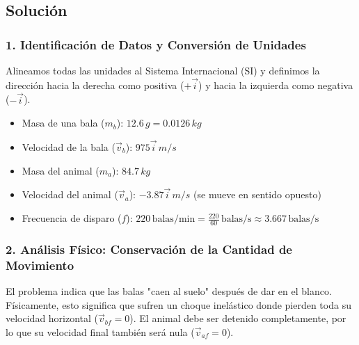 \documentclass[12pt, a4paper]{article}
\begin{document}
\begin{center}
\end{center}

\subsection*{Solución}

\subsubsection*{1. Identificación de Datos y Conversión de Unidades}
Alineamos todas las unidades al Sistema Internacional (SI) y definimos la dirección hacia la derecha como positiva ($+\vec{i}$) y hacia la izquierda como negativa ($-\vec{i}$).
\begin{itemize}
    \item Masa de una bala ($m_b$): $12.6 \, \si{g} = 0.0126 \, \si{kg}$
    \item Velocidad de la bala ($\vec{v}_b$): $975 \vec{i} \, \si{m/s}$
    \item Masa del animal ($m_a$): $84.7 \, \si{kg}$
    \item Velocidad del animal ($\vec{v}_a$): $-3.87 \vec{i} \, \si{m/s}$ (se mueve en sentido opuesto)
    \item Frecuencia de disparo ($f$): $220 \, \text{balas/min} = \frac{220}{60} \, \text{balas/s} \approx 3.667 \, \text{balas/s}$
\end{itemize}

\subsubsection*{2. Análisis Físico: Conservación de la Cantidad de Movimiento}
El problema indica que las balas "caen al suelo" después de dar en el blanco. Físicamente, esto significa que sufren un choque inelástico donde pierden toda su velocidad horizontal ($\vec{v}_{bf} = 0$). El animal debe ser detenido completamente, por lo que su velocidad final también será nula ($\vec{v}_{af} = 0$).
\end{document}
